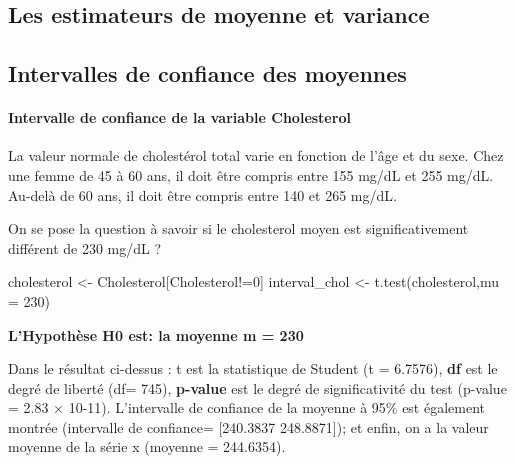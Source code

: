 \documentclass[
]{article}
\newenvironment{Shaded}{\begin{snugshade}}{\end{snugshade}}
\newcommand{\AttributeTok}[1]{\textcolor[rgb]{0.77,0.63,0.00}{#1}}
\newcommand{\DecValTok}[1]{\textcolor[rgb]{0.00,0.00,0.81}{#1}}
\newcommand{\FunctionTok}[1]{\textcolor[rgb]{0.00,0.00,0.00}{#1}}
\newcommand{\NormalTok}[1]{#1}
\newcommand{\OtherTok}[1]{\textcolor[rgb]{0.56,0.35,0.01}{#1}}
\newcommand{\SpecialCharTok}[1]{\textcolor[rgb]{0.00,0.00,0.00}{#1}}
\begin{document}
\hypertarget{les-estimateurs-de-moyenne-et-variance}{%
\subsection{Les estimateurs de moyenne et
variance}\label{les-estimateurs-de-moyenne-et-variance}}

\hypertarget{intervalles-de-confiance-des-moyennes}{%
\subsection{Intervalles de confiance des
moyennes}\label{intervalles-de-confiance-des-moyennes}}

\hypertarget{intervalle-de-confiance-de-la-variable-cholesterol}{%
\paragraph{\texorpdfstring{Intervalle de confiance de la variable
\textbf{Cholesterol}}{Intervalle de confiance de la variable Cholesterol}}\label{intervalle-de-confiance-de-la-variable-cholesterol}}

La valeur normale de cholestérol total varie en fonction de l'âge et du
sexe. Chez une femme de 45 à 60 ans, il doit être compris entre 155
mg/dL et 255 mg/dL. Au-delà de 60 ans, il doit être compris entre 140 et
265 mg/dL.

On se pose la question à savoir si le cholesterol moyen est
significativement différent de 230 mg/dL ?

\begin{Shaded}
\begin{Highlighting}[]
\NormalTok{cholesterol }\OtherTok{\textless{}{-}}\NormalTok{ Cholesterol[Cholesterol}\SpecialCharTok{!=}\DecValTok{0}\NormalTok{]}
\NormalTok{interval\_chol }\OtherTok{\textless{}{-}} \FunctionTok{t.test}\NormalTok{(cholesterol,}\AttributeTok{mu =} \DecValTok{230}\NormalTok{)}
\end{Highlighting}
\end{Shaded}

\textbf{L'Hypothèse H0 est: la moyenne m = 230}

Dans le résultat ci-dessus : t est la statistique de Student (t =
6.7576), \textbf{df} est le degré de liberté (df= 745), \textbf{p-value}
est le degré de significativité du test (p-value = 2.83 × 10-11).
L'intervalle de confiance de la moyenne à 95\% est également montrée
(intervalle de confiance= {[}240.3837 248.8871{]}); et enfin, on a la
valeur moyenne de la série x (moyenne = 244.6354).
\end{document}
